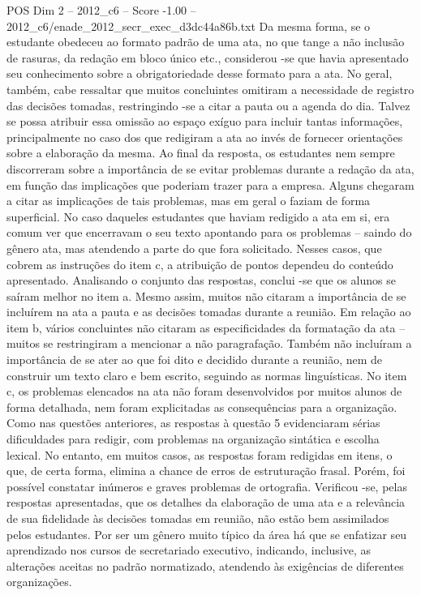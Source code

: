 \begin{textsample}{POS Dim 2 – 2012\_c6 – Score -1.00 – 2012\_c6/enade\_2012\_secr\_exec\_d3dc44a86b.txt}
Da mesma forma, se o estudante obedeceu ao formato padrão de uma ata, no que tange a não inclusão de rasuras, da redação em bloco único etc., considerou -se que havia apresentado seu conhecimento sobre a obrigatoriedade desse formato para a ata.
No geral, também, cabe ressaltar que muitos concluintes omitiram a necessidade de registro das decisões tomadas, restringindo -se a citar a pauta ou a agenda do dia.
Talvez se possa atribuir essa omissão ao espaço exíguo para incluir tantas informações, principalmente no caso dos que redigiram a ata ao invés de fornecer orientações sobre a elaboração da mesma.
Ao final da resposta, os estudantes nem sempre discorreram sobre a importância de se evitar problemas durante a redação da ata, em função das implicações que poderiam trazer para a empresa.
Alguns chegaram a citar as implicações de tais problemas, mas em geral o faziam de forma superficial.
No caso daqueles estudantes que haviam redigido a ata em si, era comum ver que encerravam o seu texto apontando para os problemas – saindo do gênero ata, mas atendendo a parte do que fora solicitado.
Nesses casos, que cobrem as instruções do item c, a atribuição de pontos dependeu do conteúdo apresentado.
Analisando o conjunto das respostas, conclui -se que os alunos se saíram melhor no item a.
Mesmo assim, muitos não citaram a importância de se incluírem na ata a pauta e as decisões tomadas durante a reunião.
Em relação ao item b, vários concluintes não citaram as especificidades da formatação da ata – muitos se restringiram a mencionar a não paragrafação.
Também não incluíram a importância de se ater ao que foi dito e decidido durante a reunião, nem de construir um texto claro e bem escrito, seguindo as normas linguísticas.
No item c, os problemas elencados na ata não foram desenvolvidos por muitos alunos de forma detalhada, nem foram explicitadas as consequências para a organização.
Como nas questões anteriores, as respostas à questão 5 evidenciaram sérias dificuldades para redigir, com problemas na organização sintática e escolha lexical.
No entanto, em muitos casos, as respostas foram redigidas em itens, o que, de certa forma, elimina a chance de erros de estruturação frasal.
Porém, foi possível constatar inúmeros e graves problemas de ortografia.
Verificou -se, pelas respostas apresentadas, que os detalhes da elaboração de uma ata e a relevância de sua fidelidade às decisões tomadas em reunião, não estão bem assimilados pelos estudantes.
Por ser um gênero muito típico da área há que se enfatizar seu aprendizado nos cursos de secretariado executivo, indicando, inclusive, as alterações aceitas no padrão normatizado, atendendo às exigências de diferentes organizações.

\end{textsample}
